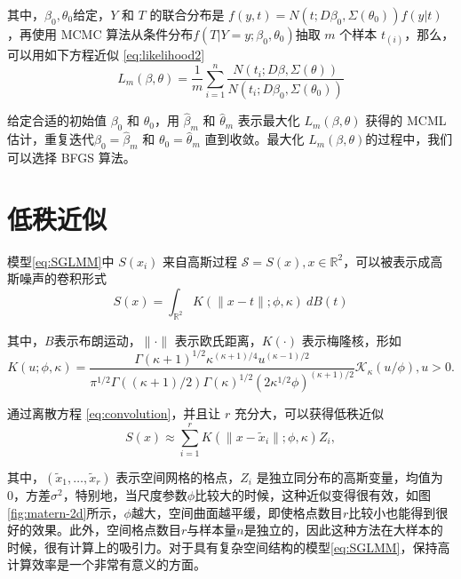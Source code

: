 \documentclass[hyperref, a4paper, UTF8, zihao = -4, linespread = 1.25, scheme = chinese]{ctexbook}
\begin{document}
其中，\(\beta_{0},\theta_{0}\)给定，\(Y\) 和 \(T\) 的联合分布是
\(f(y,t)=N(t;D\beta_{0},\Sigma(\theta_{0}))f(y|t)\)，再使用 MCMC
算法从条件分布\(f(T|Y=y;\beta_0,\theta_0)\)抽取 \(m\) 个样本
\(t_{(i)}\)，那么，可以用如下方程近似 \eqref{eq:likelihood2}
\begin{equation}
L_{m}(\beta,\theta)=\frac{1}{m}\sum_{i=1}^{n}\frac{N(t_{i};D\beta,\Sigma(\theta))}{N(t_{i};D\beta_{0},\Sigma(\theta_{0}))} \label{eq:likelihood-approx}
\end{equation}

给定合适的初始值 \(\beta_{0}\) 和 \(\theta_{0}\)，用 \(\hat{\beta}_{m}\)
和 \(\hat{\theta}_{m}\) 表示最大化 \(L_{m}(\beta,\theta)\) 获得的 MCML
估计，重复迭代\(\beta_{0}=\hat{\beta}_{m}\) 和
\(\theta_{0}=\hat{\theta}_{m}\) 直到收敛。最大化
\(L_{m}(\beta,\theta)\)的过程中，我们可以选择 BFGS 算法。

\section{低秩近似}

模型\eqref{eq:SGLMM}中 \(S(x_i)\) 来自高斯过程
\(\mathcal{S} = S(x),x\in \mathbb{R}^2\)，可以被表示成高斯噪声的卷积形式\begin{equation}
S(x) = \int_{\mathbb{R}^2} K(\|x-t\|; \phi, \kappa) \: d B(t) \label{eq:convolution}
\end{equation}

其中，\(B\)表示布朗运动，\(\|\cdot\|\) 表示欧氏距离，\(K(\cdot)\)
表示梅隆核，形如\begin{equation}
K(u; \phi, \kappa) = \frac{\Gamma(\kappa + 1)^{1/2}\kappa^{(\kappa+1)/4}u^{(\kappa-1)/2}}{\pi^{1/2}\Gamma((\kappa+1)/2)\Gamma(\kappa)^{1/2}(2\kappa^{1/2}\phi)^{(\kappa+1)/2}}\mathcal{K}_{\kappa}(u/\phi), u > 0. \label{eq:matern-kernel}
\end{equation}

通过离散方程 \eqref{eq:convolution}，并且让 \(r\)
充分大，可以获得低秩近似\begin{equation}
S(x) \approx \sum_{i = 1}^r K(\|x-\tilde{x}_{i}\|; \phi, \kappa) Z_{i}, \label{eq:lr-approx}
\end{equation}

其中，\((\tilde{x}_{1},\ldots,\tilde{x}_{r})\)
表示空间网格的格点，\(Z_{i}\)
是独立同分布的高斯变量，均值为0，方差\(\sigma^2\)，特别地，当尺度参数\(\phi\)比较大的时候，这种近似变得很有效，如图\ref{fig:matern-2d}所示，\(\phi\)越大，空间曲面越平缓，即使格点数目\(r\)比较小也能得到很好的效果。此外，空间格点数目\(r\)与样本量\(n\)是独立的，因此这种方法在大样本的时候，很有计算上的吸引力。对于具有复杂空间结构的模型\eqref{eq:SGLMM}，保持高计算效率是一个非常有意义的方面。
\end{document}
